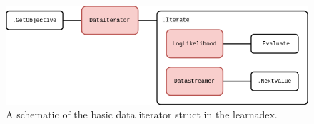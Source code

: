 \begin{figure}[h]
\centering
\includegraphics[width=13cm]{images/learnadex-data-iterator.drawio.png}
\caption{A schematic of the basic data iterator struct in the learnadex.}
\label{fig:learnadex-data-iterator}
\end{figure}
    
